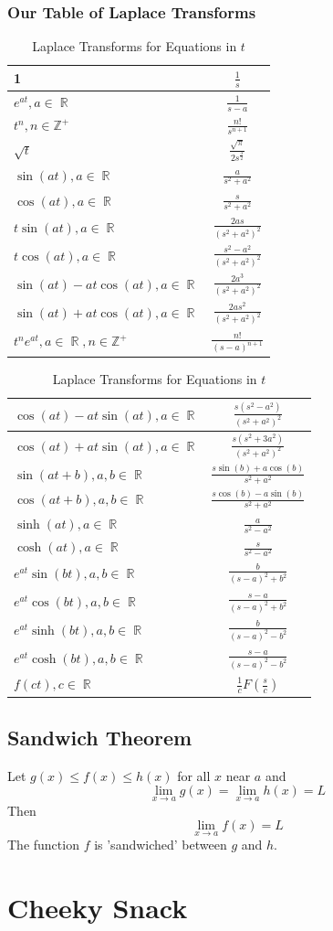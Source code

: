 \documentclass[a4paper,twoside]{article}
\DeclareMathOperator\R{\mathbb{R}}
\begin{document}
		\subsubsection{Our Table of Laplace Transforms}
			\bgroup
			\everymath{\displaystyle}
			\def\arraystretch{2.5}
			\begin{table}[H]
				\footnotesize
				\begin{tabular}[t]{|p{5cm}|c|}
					\hline
					1&$\frac{1}{s}$\\\hline
					$e^{at},a\in\R$&$\frac{1}{s-a}$\\\hline
					$t^n,n\in\mathbb{Z}^+$&$\frac{n!}{s^{n+1}}$\\\hline
					$\sqrt{t}$&$\frac{\sqrt{\pi}}{2s^{\frac{3}{2}}}$\\\hline
					$\sin(at),a\in\R$&$\frac{a}{s^2+a^2}$\\\hline
					$\cos(at),a\in\R$&$\frac{s}{s^2+a^2}$\\\hline
					$t\sin(at),a\in\R$&$\frac{2as}{(s^2+a^2)^2}$\\\hline
					$t\cos(at),a\in\R$&$\frac{s^2-a^2}{(s^2+a^2)^2}$\\\hline
					$\sin(at)-at\cos(at),a\in\R$&$\frac{2a^3}{(s^2+a^2)^2}$\\\hline
					$\sin(at)+at\cos(at),a\in\R$&$\frac{2as^2}{(s^2+a^2)^2}$\\\hline
					$t^ne^{at},a\in\R,n\in\mathbb{Z}^+$&$\frac{n!}{(s-a)^{n+1}}$\\\hline
				\end{tabular}
				\hfill
				\begin{tabular}[t]{|p{5cm}|c|}
					\hline
					$\cos(at)-at\sin(at),a\in\R$&$\frac{s(s^2-a^2)}{(s^2+a^2)^2}$\\\hline
					$\cos(at)+at\sin(at),a\in\R$&$\frac{s(s^2+3a^2)}{(s^2+a^2)^2}$ \\\hline
					$\sin(at+b),a,b\in\R$&$\frac{s\sin(b)+a\cos(b)}{s^2+a^2}$\\\hline
					$\cos(at+b),a,b\in\R$&$\frac{s\cos(b)-a\sin(b)}{s^2+a^2}$ \\\hline   
					$\sinh(at),a\in\R$&$\frac{a}{s^2-a^2}$\\\hline
					$\cosh(at),a\in\R$&$\frac{s}{s^2-a^2}$\\\hline
					$e^{at}\sin(bt),a,b\in\R$&$\frac{b}{(s-a)^2+b^2}$\\\hline
					$e^{at}\cos(bt),a,b\in\R$&$\frac{s-a}{(s-a)^2+b^2}$\\\hline
					$e^{at}\sinh(bt),a,b\in\R$&$\frac{b}{(s-a)^2-b^2}$\\\hline
					$e^{at}\cosh(bt),a,b\in\R$&$\frac{s-a}{(s-a)^2-b^2}$\\\hline
					$f(ct),c\in\R$&$\frac{1}{c}F(\frac{s}{c})$\\\hline
				\end{tabular}
				\caption{Laplace Transforms for Equations in $t$}
			\end{table}
			\everymath{}
			\egroup
		\subsection{Sandwich Theorem}
			Let $g(x)\leq f(x)\leq h(x)$ for all $x$ near $a$ and
			\[
				\lim_{x\to a}g(x)=\lim_{x\to a}h(x)=L
			\]
			Then
			\[
				\lim_{x\to a}f(x)=L
			\]
			The function $f$ is 'sandwiched' between $g$ and $h$.
	\newpage
	\section{Cheeky Snack}
\end{document}

